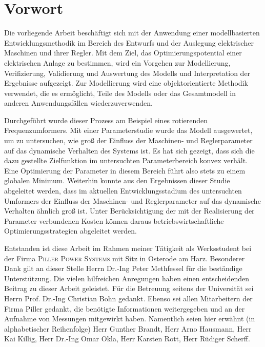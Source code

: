 \chapter{Vorwort}
\label{sec:Vorwort}
Die vorliegende Arbeit beschäftigt sich mit der Anwendung einer modellbasierten Entwicklungsmethodik im Bereich des Entwurfs und der Auslegung elektrischer Maschinen und ihrer Regler. Mit dem Ziel, das Optimierungspotential einer elektrischen Anlage zu bestimmen, wird ein Vorgehen zur Modellierung, Verifizierung, Validierung und Auswertung des Modells und Interpretation der Ergebnisse aufgezeigt. Zur Modellierung wird eine objektorientierte Methodik verwendet, die es ermöglicht, Teile des Modells oder das Gesamtmodell in anderen Anwendungsfällen wiederzuverwenden. 

Durchgeführt wurde dieser Prozess am Beispiel eines rotierenden Frequenzumformers. Mit einer Parameterstudie wurde das Modell ausgewertet, um zu untersuchen, wie groß der Einfluss der Maschinen- und Reglerparameter auf das dynamische Verhalten des Systems ist. Es hat sich gezeigt, dass sich die dazu gestellte Zielfunktion im untersuchten Parameterbereich konvex verhält. Eine Optimierung der Parameter in diesem Bereich führt also stets zu einem globalen Minimum. Weiterhin konnte aus den Ergebnissen dieser Studie abgeleitet werden, dass im aktuellen Entwicklungsstadium des untersuchten Umformers der Einfluss der Maschinen- und Reglerparameter auf das dynamische Verhalten ähnlich groß ist. Unter Berücksichtigung der mit der Realisierung der Parameter verbundenen Kosten können daraus betriebswirtschaftliche Optimierungsstrategien abgeleitet werden.

Entstanden ist diese Arbeit im Rahmen meiner Tätigkeit als Werksstudent bei der Firma \textsc{Piller Power Systems} mit Sitz in Osterode am Harz. Besonderer Dank gilt an dieser Stelle Herrn Dr.-Ing Peter Methfessel für die beständige Unterstützung. Die vielen hilfreichen Anregungen haben einen entscheidenden Beitrag zu dieser Arbeit geleistet. Für die Betreuung seitens der Universität sei Herrn Prof. Dr.-Ing Christian Bohn gedankt. Ebenso sei allen Mitarbeitern der Firma Piller gedankt, die benötigte Informationen weitergegeben und an der Aufnahme von Messungen mitgewirkt haben. Namentlich seien hier erwähnt (in alphabetischer Reihenfolge) Herr Gunther Brandt, Herr Arno Hausmann, Herr Kai Killig, Herr Dr.-Ing Omar Okla, Herr Karsten Rott, Herr Rüdiger Scherff. 